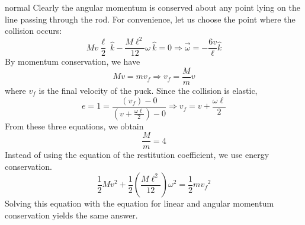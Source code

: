 \begin{solution}{normal}
 Clearly the angular momentum is conserved about any point lying on the line passing through the rod. For convenience, let us choose the point where the collision occurs: $$M v \frac{\ell}{2} \ \hat{k} - \frac{M{\ell}^2}{12} \omega \ \hat{k} = 0 \Rightarrow \vec{\omega} = -\frac{6v}{\ell} \hat{k}$$ By momentum conservation, we have $$M v = m v_f \Rightarrow v_f = \frac{M}{m} v$$ where $v_f$ is the final velocity of the puck. Since the collision is elastic, $$ e = 1 = \frac{(v_f)-0}{(v+ \frac{\omega \ell}{2}) - 0} \Rightarrow v_f = v+\frac{\omega \ell}{2}$$ From these three equations, we obtain $$\frac{M}{m} = 4$$ 
\tcbline
Instead of using the equation of the restitution coefficient, we use energy conservation. $$\frac{1}{2} Mv^2 + \frac{1}{2} \left(\frac{M{\ell}^2}{12}\right) \omega^2 = \frac{1}{2}m{v_f}^2$$ Solving this equation with the equation for linear and angular momentum conservation yields the same answer. 
\end{solution}
